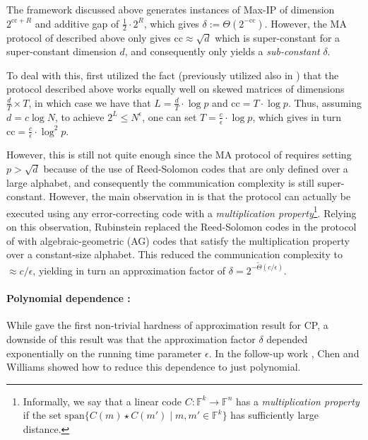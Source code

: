 \documentclass[11pt]{article}
\theoremstyle{plain}
\theoremstyle{remark}
\newcommand{\F}{\mathbb{F}}
\newcommand{\cc}{\mathrm{cc}}
\newcommand{\spn}{\mathrm{span}}
\begin{document}
The \cite{ARW17} framework discussed above generates instances of Max-IP of dimension $2^{\cc+R}$ and additive gap  of $\frac 1 2\cdot 2^R$, which gives $\delta:=\Theta(2^{-\cc})$. However, the MA protocol of \cite{AW09} described above only gives $\cc \approx \sqrt{d} $ which is super-constant for a super-constant dimension $d$, and consequently only yields a \emph{sub-constant} $\delta$.


To deal with this, \cite{Rub18} first utilized the fact (previously utilized also in \cite{ARW17}) that the \cite{AW09} protocol described above works equally well on skewed matrices of dimensions $\frac d T \times T$, in which case we have that $L=\frac d T \cdot \log p$ and $\cc= T \cdot \log p$. 
Thus, assuming $d = c \log N$, to achieve $2^L \leq N^{\epsilon}$, one can set $T = \frac c \epsilon \cdot \log p $, which gives in turn $\cc=\frac c \epsilon \cdot \log ^2p$.

However, this is still not quite enough since the MA protocol of \cite{AW09} requires setting $p >  \sqrt{d}$ because of the use of Reed-Solomon codes that are only defined over a large alphabet, and consequently the communication complexity is still super-constant. However, the main observation in \cite{AW09} is that the protocol can actually be executed using any error-correcting code with a \emph{multiplication property}\footnote{Informally, we say that a linear code $C:\F^k \to \F^n$ has a \emph{multiplication property} if the set $\spn\{C(m) \star C(m') \mid m,m' \in \F^k  \}$ has sufficiently large distance.}. 
Relying on this observation, Rubinstein replaced the Reed-Solomon codes in the protocol of \cite{AW09} with algebraic-geometric (AG) codes that satisfy the multiplication property over a constant-size alphabet.
This reduced the communication complexity to $ \approx c/\epsilon$, yielding in turn an approximation factor of $\delta = 2^{- \tilde \Theta (c/\epsilon)}$. 

\paragraph{Polynomial dependence \cite{CW19}:}

While \cite{Rub18} gave the first non-trivial hardness of approximation result for CP, a downside of this result was that the approximation factor $\delta$ depended exponentially on the running time parameter $\epsilon$. In the follow-up work \cite{CW19}, Chen and Williams showed how to reduce this dependence to just polynomial.
\end{document}
